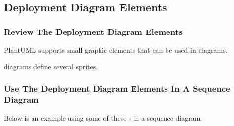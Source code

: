 \documentclass[letterpaper,10pt,english]{sphinxmanual}
\begin{document}
\subsection{Deployment Diagram Elements}
\label{\detokenize{PlantUMLSpriteLibraries/plantuml_sprites:deployment-diagram-elements}}

\subsubsection{Review The Deployment Diagram Elements}
\label{\detokenize{PlantUMLSpriteLibraries/plantuml_sprites:review-the-deployment-diagram-elements}}
PlantUML supports  small graphic elements that can be used in diagrams.

 diagrams define several sprites.

\begin{figure}[htbp]
\centering

\end{figure}

\begin{sphinxVerbatim}[commandchars=\\\{\},numbers=left,firstnumber=1,stepnumber=1]
 
 
 
 
 
 
 
 
 
 
 
 
 
  
 
 
 
 
 
 
 
\end{sphinxVerbatim}


\subsubsection{Use The Deployment Diagram Elements In A Sequence Diagram}
\label{\detokenize{PlantUMLSpriteLibraries/plantuml_sprites:use-the-deployment-diagram-elements-in-a-sequence-diagram}}
Below is an example using some of these - in a sequence diagram.
\end{document}
